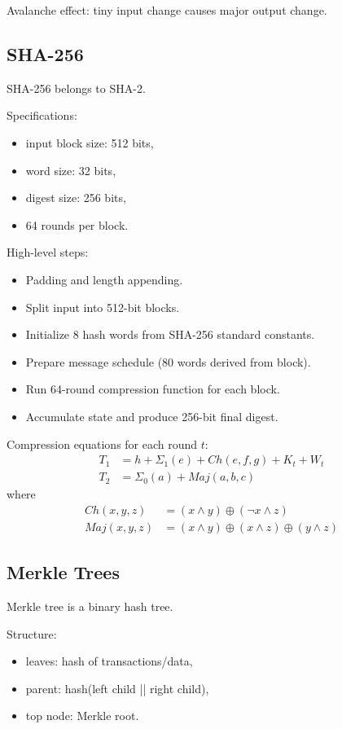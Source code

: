 \documentclass[12pt,a4paper]{article}
\begin{document}
Avalanche effect: tiny input change causes major output change.

\subsection{SHA-256}
SHA-256 belongs to SHA-2.

Specifications:
\begin{itemize}
\item input block size: 512 bits,
\item word size: 32 bits,
\item digest size: 256 bits,
\item 64 rounds per block.
\end{itemize}

High-level steps:
\begin{itemize}
\item Padding and length appending.
\item Split input into 512-bit blocks.
\item Initialize 8 hash words from SHA-256 standard constants.
\item Prepare message schedule (80 words derived from block).
\item Run 64-round compression function for each block.
\item Accumulate state and produce 256-bit final digest.
\end{itemize}

Compression equations for each round \(t\):
\begin{align}
T_1 &= h + \Sigma_1(e) + Ch(e,f,g) + K_t + W_t \\
T_2 &= \Sigma_0(a) + Maj(a,b,c)
\end{align}
where
\begin{align}
Ch(x,y,z) &= (x \wedge y) \oplus (\neg x \wedge z) \\
Maj(x,y,z) &= (x \wedge y) \oplus (x \wedge z) \oplus (y \wedge z)
\end{align}

\subsection{Merkle Trees}
Merkle tree is a binary hash tree.

Structure:
\begin{itemize}
\item leaves: hash of transactions/data,
\item parent: hash(left child || right child),
\item top node: Merkle root.
\end{itemize}
\end{document}

